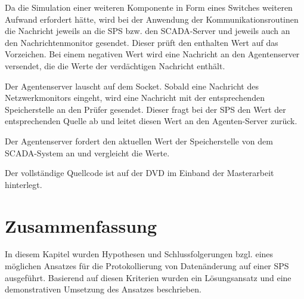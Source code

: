 Da die Simulation einer weiteren Komponente in Form eines Switches weiteren Aufwand erfordert hätte, wird bei der Anwendung der Kommunikationsroutinen die Nachricht jeweils an die SPS bzw. den SCADA-Server und jeweils auch an den Nachrichtenmonitor gesendet. Dieser prüft den enthalten Wert auf das Vorzeichen. Bei einem negativen Wert wird eine Nachricht an den Agentenserver versendet, die die Werte der verdächtigen Nachricht enthält.

Der Agentenserver lauscht auf dem Socket. Sobald eine Nachricht des Netzwerkmonitors eingeht, wird eine Nachricht mit der entsprechenden Speicherstelle an den Prüfer gesendet. Dieser fragt bei der SPS den Wert der entsprechenden Quelle ab und leitet diesen Wert an den Agenten-Server zurück. 

Der Agentenserver fordert den aktuellen Wert der Speicherstelle von dem SCADA-System an und vergleicht die Werte. 

Der vollständige Quellcode ist auf der DVD im Einband der Masterarbeit hinterlegt.

\section{Zusammenfassung}
In diesem Kapitel wurden Hypothesen und Schlussfolgerungen bzgl. eines möglichen Ansatzes für die Protokollierung von Datenänderung auf einer SPS ausgeführt. Basierend auf diesen Kriterien wurden ein Lösungsansatz und eine demonstrativen Umsetzung des Ansatzes beschrieben.